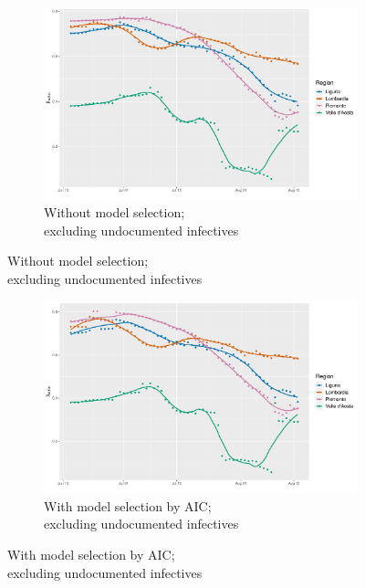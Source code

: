 \documentclass[12pt]{article}
\begin{document}
\begin{appendices}
		\begin{figure}[H]
    	    \centering
    	    \begin{subfigure}{\textwidth}
    	      \centering
    	      \includegraphics[width=0.91\linewidth]{output/model_within_lag14_betawithin_Nord-Ovest_rolling.pdf}
    	      \caption{Without model selection; \\ excluding undocumented infectives}
    	      \label{fig:beta_within_over_time_northwest_regular}
    	    \end{subfigure}\newline
        \end{figure}
        \begin{figure}[H]\ContinuedFloat
    	    \begin{subfigure}{\textwidth}
    	      \centering
    	      \includegraphics[width=0.91\linewidth]{output/model_within_lag14_betawithin_Nord-Ovest_aic_rolling.pdf}
    	      \caption{With model selection by AIC; \\ excluding undocumented infectives}
    	      \label{fig:beta_within_over_time_northwest_aic}
    	    \end{subfigure}

\end{figure}
\end{appendices}
\end{document}
